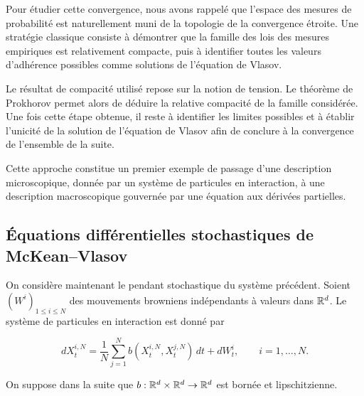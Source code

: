 Pour étudier cette convergence, nous avons rappelé que l'espace des mesures de probabilité est naturellement muni de la topologie de la convergence étroite. Une stratégie classique consiste à démontrer que la famille des lois des mesures empiriques est relativement compacte, puis à identifier toutes les valeurs d'adhérence possibles comme solutions de l'équation de Vlasov.

\begin{important}

	Le résultat de compacité utilisé repose sur la notion de tension.
	Le théorème de Prokhorov permet alors de déduire la relative compacité de la famille considérée. Une fois cette étape obtenue, il reste à identifier les limites possibles et à établir l'unicité de la solution de l'équation de Vlasov afin de conclure à la convergence de l'ensemble de la suite.
\end{important}

Cette approche constitue un premier exemple de passage d'une description microscopique, donnée par un système de particules en interaction, à une description macroscopique gouvernée par une équation aux dérivées partielles.

\subsection{Équations différentielles stochastiques de McKean--Vlasov}

On considère maintenant le pendant stochastique du système précédent. Soient
$(W^i)_{1\leq i\leq N}$ des mouvements browniens indépendants à valeurs dans $\mathbb{R}^d$.
Le système de particules en interaction est donné par
\begin{important}
	\begin{equation}
		dX_t^{i,N}
		=
		\frac1N
		\sum_{j=1}^{N}
		b(X_t^{i,N},X_t^{j,N})\,dt
		+
		dW_t^i,
		\qquad i=1,\dots,N.
		\label{eq:systeme_particules_stochastique}
	\end{equation}
\end{important}
On suppose dans la suite que $b:\mathbb{R}^d\times\mathbb{R}^d\to\mathbb{R}^d$ est bornée et lipschitzienne.

